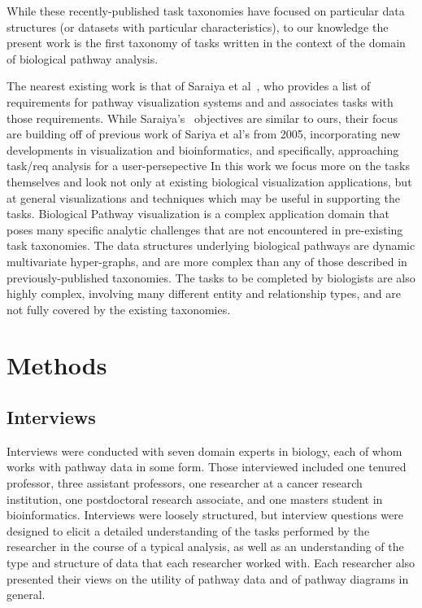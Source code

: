 \documentclass[twocolumn]{bmcart}%
\begin{document}
While these recently-published task taxonomies have focused on particular data structures (or datasets with particular characteristics), to our knowledge the present work is the first taxonomy of tasks written in the context of the domain of biological pathway analysis.

The nearest existing work is that of Saraiya et al~\cite{saraiya2005visualizing}, who provides a list of requirements for pathway visualization systems and and associates tasks with those requirements. While Saraiya's~\cite{saraiya2005visualizing} objectives are similar to ours, their focus  are building off of previous work of Sariya et al’s from 2005, incorporating new developments in visualization and bioinformatics, and specifically, approaching task/req analysis for a user-persepective
In this work we focus more on the tasks themselves and look not only at existing biological visualization applications, but at general visualizations and techniques which may be useful in supporting the tasks.
Biological Pathway visualization is a complex application domain that poses many specific analytic challenges that are not encountered in pre-existing task taxonomies.
The data structures underlying biological pathways are dynamic multivariate hyper-graphs, and are more complex than any of those described in previously-published taxonomies.
The tasks to be completed by biologists are also highly complex, involving many different entity and relationship types, and are not fully covered by the existing taxonomies.

\section*{Methods}

\subsection*{Interviews}

Interviews were conducted with seven domain experts in biology, each of whom works with pathway data in some form.
Those interviewed included one tenured professor, three assistant professors, one researcher at a cancer research institution, one postdoctoral research associate, and one masters student in bioinformatics.
Interviews were loosely structured, but interview questions were designed to elicit a detailed understanding of the tasks performed by the researcher in the course of a typical analysis, as well as an understanding of the type and structure of data that each researcher worked with.
Each researcher also presented their views on the utility of pathway data and of pathway diagrams in general.
\end{document}
